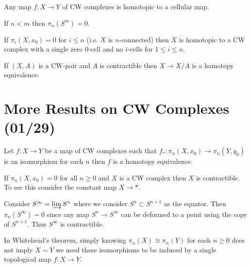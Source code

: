 \documentclass[12pt]{extarticle}
\begin{document}
\begin{theorem}
Any map $f : X \to Y$ of CW complexes is homotopic to a cellular map.
\end{theorem}

\begin{corollary}
If $n < m$ then $\pi_n(S^m) = 0$. 
\end{corollary}

\begin{theorem}
If $\pi_i(X, x_0) = 0$ for $i \le n$ (i.e. $X$ is $n$-connected) then $X$ is homotopic to a CW complex with a single zero $0$-cell and no $i$-cells for $1 \le i \le n$. 
\end{theorem}

\begin{lemma}
If $(X, A)$ is a CW-pair and $A$ is contractible then $X \to X / A$ is a homotopy equivalence. 
\end{lemma}


\section{More Results on CW Complexes (01/29)}

\begin{theorem}[Whitehead]
Let $f : X \to Y$ be a map of CW complexes such that $f_* : \pi_n(X, x_0) \to \pi_n(Y, y_0)$ is an isomorphism for each $n$ then $f$ is a homotopy equivalence. 
\end{theorem}


\begin{example}
If $\pi_n(X, x_0) = 0$ for all $n \ge 0$ and $X$ is a CW complex then $X$ is contractible. To see this consider the constant map $X \to *$. 
\end{example}

\begin{example}
Consider $S^\infty = \varinjlim S^n$ where we consider $S^n \subset S^{n+1}$ as the equator. Then $\pi_n(S^\infty) = 0$ since any map $S^n \to S^{\infty}$ can be deformed to a point using the copy of $S^{n+1}$. Thus $S^\infty$ is contractible. 
\end{example}

\begin{remark}
In Whitehead's theorem, simply knowing $\pi_n(X) \cong \pi_n(Y)$ for each $n \ge 0$ does not imply $X \sim Y$ we need these isomorphisms to be induced by a single topological map $f : X \to Y$. 
\end{remark}
\end{document}
